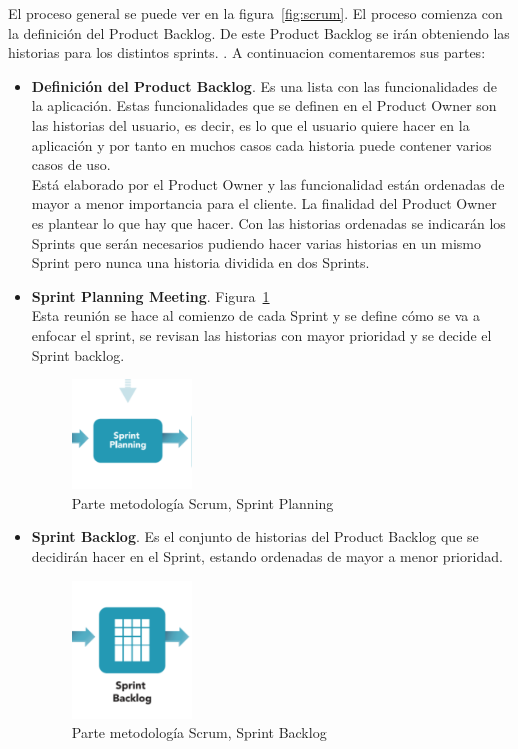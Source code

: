 El proceso general se puede ver en la figura~\ref{fig:scrum}. El proceso comienza con la definición del Product Backlog. De este Product Backlog  se irán obteniendo las historias para los distintos sprints. . A continuacion comentaremos sus partes:
\begin{itemize}
\item \textbf{Definición del Product Backlog}. 
Es una lista con las funcionalidades de la aplicación.
Estas funcionalidades que se definen en el Product Owner son las historias del usuario, es decir, es lo que el usuario quiere hacer en la aplicación y por tanto en muchos casos cada historia puede contener varios casos de uso. \\
Está elaborado por el Product Owner y las funcionalidad están ordenadas de mayor a menor importancia para el cliente. La finalidad del Product Owner es plantear lo que hay que hacer.
Con las historias ordenadas se indicarán los Sprints que serán necesarios pudiendo hacer  varias historias en un mismo Sprint pero nunca una historia dividida en dos Sprints. 

 



\item \textbf{Sprint Planning Meeting}. Figura~\ref{fig:planing}\\
 Esta reunión se hace al comienzo de cada Sprint y se define cómo se va a enfocar el sprint, se revisan las historias con mayor prioridad y se decide el Sprint backlog.
\begin{figure}[H]
		\centering
		\includegraphics[width=0.3\textwidth] {planing.png}
		\caption{Parte metodología Scrum, Sprint Planning }\label{fig:planing}
	\end{figure} 

\item \textbf{Sprint Backlog}. 
Es el conjunto de historias del Product Backlog que se decidirán hacer en el Sprint, estando ordenadas de mayor a menor prioridad. 

\begin{figure}[H]
		\centering
		\includegraphics[width=0.3\textwidth] {sprint.png}
		\caption{Parte metodología Scrum, Sprint Backlog }\label{fig:sprint}
	\end{figure} 


\end{itemize}
